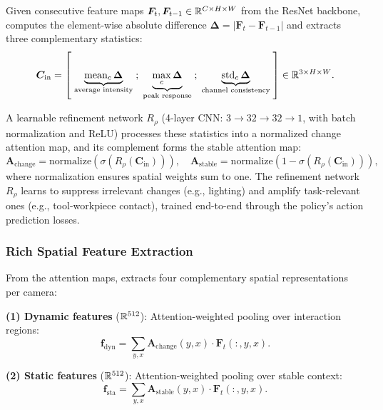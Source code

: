 Given consecutive feature maps $\bm{F}_t, \bm{F}_{t-1} \in \mathbb{R}^{C \times H \times W}$ from the ResNet backbone, \fasa{} computes the element-wise absolute difference $\bm{\Delta} = |\bm{F}_t - \bm{F}_{t-1}|$ and extracts three complementary statistics:
\begin{equation}
    \bm{C}_{\text{in}} = \left[\;
        \underbrace{\textstyle\text{mean}_c\, \bm{\Delta}}_{\text{average intensity}}\;;\;
        \underbrace{\max_c \bm{\Delta}}_{\text{peak response}}\;;\;
        \underbrace{\text{std}_c\, \bm{\Delta}}_{\text{channel consistency}}
    \;\right] \in \mathbb{R}^{3 \times H \times W}.
    \label{eq:change_input}
\end{equation}

A learnable refinement network $R_\rho$ (4-layer CNN: $3 \to 32 \to 32 \to 1$, with batch normalization and ReLU) processes these statistics into a normalized change attention map, and its complement forms the stable attention map:
\begin{equation}
    \bm{A}_{\text{change}} = \text{normalize}\!\left(\sigma(R_\rho(\bm{C}_{\text{in}}))\right), \quad
    \bm{A}_{\text{stable}} = \text{normalize}\!\left(1 - \sigma(R_\rho(\bm{C}_{\text{in}}))\right),
    \label{eq:change_attn}
\end{equation}
where normalization ensures spatial weights sum to one. The refinement network $R_\rho$ learns to suppress irrelevant changes (e.g., lighting) and amplify task-relevant ones (e.g., tool-workpiece contact), trained end-to-end through the policy's action prediction losses.

\subsubsection{Rich Spatial Feature Extraction}
\label{sec:fasa_features}

From the attention maps, \fasa{} extracts four complementary spatial representations per camera:

\textbf{(1) Dynamic features} ($\mathbb{R}^{512}$): Attention-weighted pooling over interaction regions:
\begin{equation}
    \bm{f}_{\text{dyn}} = \textstyle\sum_{y,x} \bm{A}_{\text{change}}(y,x) \cdot \bm{F}_t(:,y,x).
    \label{eq:dynamic_pool}
\end{equation}

\textbf{(2) Static features} ($\mathbb{R}^{512}$): Attention-weighted pooling over stable context:
\begin{equation}
    \bm{f}_{\text{sta}} = \textstyle\sum_{y,x} \bm{A}_{\text{stable}}(y,x) \cdot \bm{F}_t(:,y,x).
    \label{eq:static_pool}
\end{equation}

